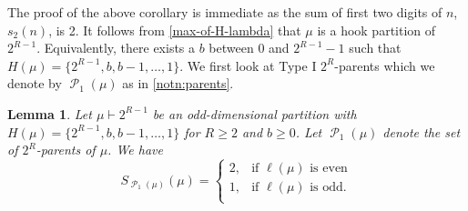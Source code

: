 \documentclass[12pt]{amsart}
\newtheorem{lemma}[theorem]{Lemma}
\theoremstyle{definition}
\numberwithin{equation}{section}
\DeclareMathOperator{\p}{\mathcal{P}}
\begin{document}
The proof of the above corollary is immediate as the sum of first two digits of $n$, $s_2(n)$, is 2. It follows from \cref{max-of-H-lambda} that $\mu$ is a hook partition of $2^{R-1}$. Equivalently, there exists a $b$ between 0 and $2^{R-1}-1$ such that $H(\mu) = \{2^{R-1}, b, b-1,\ldots, 1\}$. We first look at Type I $2^R$-parents which we denote by $\p_1(\mu)$ as in \cref{notn:parents}.
\begin{lemma}\label{lem:7}
Let $\mu\vdash 2^{R-1}$ be an odd-dimensional partition with $H(\mu) = \{2^{R-1},b, b-1,\ldots, 1\}$ for $R\geq 2$ and $b\geq 0$. Let $\p_1(\mu)$ denote the set of $2^R$-parents of $\mu$. We have 
\[
S_{\p_1(\mu)}(\mu) = \begin{cases}
2 ,& \text{if } \ell(\mu)\text{ is even}\\
1, & \text{if }\ell(\mu) \text{ is odd}.\\
\end{cases}
\]
\end{lemma}
\end{document}
